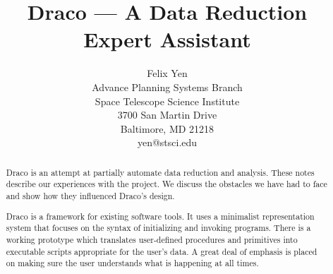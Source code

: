 




\title{Draco --- A Data Reduction Expert Assistant}

\author{Felix Yen\\
	Advance Planning Systems Branch\\
	Space Telescope Science Institute\\
	3700 San Martin Drive\\
	Baltimore, MD  21218\\
	yen@stsci.edu}

%

\maketitle

\begin{abstract}
Draco is an attempt at partially automate data reduction and analysis.  These
notes describe our experiences with the project.  We discuss the obstacles we
have had to face and show how they influenced Draco's design.

Draco is a framework for existing software tools.  It uses a minimalist
representation system that focuses on the syntax of initializing and invoking
programs.  There is a working prototype which translates user-defined
procedures and primitives into executable scripts appropriate for the user's
data.  A great deal of emphasis is placed on making sure the user understands
what is happening at all times.
\end{abstract}

